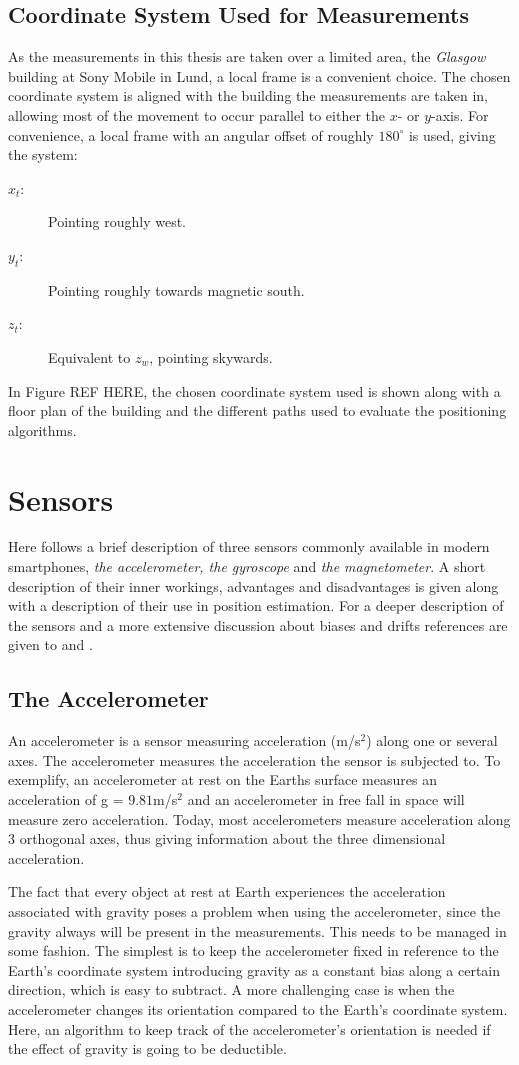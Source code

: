 \documentclass{LTHthesis}
\begin{document}
\subsection{Coordinate System Used for Measurements}
%
As the measurements in this thesis are taken over a limited area, the \emph{Glasgow} building at Sony Mobile in Lund, a local frame is a convenient choice. The chosen coordinate system is aligned with the building the measurements are taken in, allowing most of the movement to occur parallel to either the $x$- or $y$-axis. For convenience, a local frame with an angular offset of roughly $180^\circ$ is used, giving the system:
%
\begin{description}
\item[$x_t$:] Pointing roughly west. 
\item[$y_t$:] Pointing roughly towards magnetic south.
\item[$z_t$:] Equivalent to $z_w$, pointing skywards.
\end{description}
%
In Figure REF HERE, the chosen coordinate system used is shown along with a floor plan of the building and the different paths used to evaluate the positioning algorithms. 
%
\section{Sensors}
Here follows a brief description of three sensors commonly available in modern smartphones, \emph{the accelerometer, the gyroscope} and \emph{the magnetometer}. A short description of their inner workings, advantages and disadvantages is given along with a description of their use in position estimation. For a deeper description of the sensors and a more extensive discussion about biases and drifts references are given to \cite{bently88} and \cite{morris96}. 
%
\subsection{The Accelerometer}
%
An accelerometer is a sensor measuring acceleration (m/s$^2$) along one or several axes. The accelerometer measures the acceleration the sensor is subjected to. To exemplify, an accelerometer at rest on the Earths surface measures an acceleration of g = $9.81$m/s$^2$ and an accelerometer in free fall in space will measure zero acceleration. Today, most accelerometers measure acceleration along 3 orthogonal axes, thus giving information about the three dimensional acceleration. 

The fact that every object at rest at Earth experiences the acceleration associated with gravity poses a problem when using the accelerometer, since the gravity always will be present in the measurements. This needs to be managed in some fashion. The simplest is to keep the accelerometer fixed in reference to the Earth's coordinate system introducing gravity as a constant bias along a certain direction, which is easy to subtract. A more challenging case is when the accelerometer changes its orientation compared to the Earth's coordinate system. Here, an algorithm to keep track of the accelerometer's orientation is needed if the effect of gravity is going to be deductible. 
\end{document}
